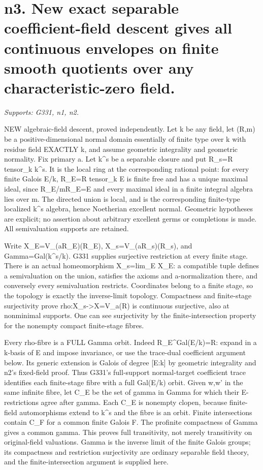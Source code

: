 \section{n3. New exact separable coefficient-field descent gives all continuous envelopes on finite smooth quotients over any characteristic-zero field.}
\textit{Supports: G331, n1, n2.}

NEW algebraic-field descent, proved independently. Let k be any field, let (R,m) be a positive-dimensional normal domain essentially of finite type over k with residue field EXACTLY k, and assume geometric integrality and geometric normality. Fix primary a. Let k\textasciicircum{}s be a separable closure and put R\_s=R tensor\_k k\textasciicircum{}s. It is the local ring at the corresponding rational point: for every finite Galois E/k, R\_E=R tensor\_k E is finite free and has a unique maximal ideal, since R\_E/mR\_E=E and every maximal ideal in a finite integral algebra lies over m. The directed union is local, and is the corresponding finite-type localized k\textasciicircum{}s algebra, hence Noetherian excellent normal. Geometric hypotheses are explicit; no assertion about arbitrary excellent germs or completions is made. All semivaluation supports are retained.

Write X\_E=V\_(aR\_E)(R\_E), X\_s=V\_(aR\_s)(R\_s), and Gamma=Gal(k\textasciicircum{}s/k). G331 supplies surjective restriction at every finite stage. There is an actual homeomorphism X\_s=lim\_E X\_E: a compatible tuple defines a semivaluation on the union, satisfies the axioms and a-normalization there, and conversely every semivaluation restricts. Coordinates belong to a finite stage, so the topology is exactly the inverse-limit topology. Compactness and finite-stage surjectivity prove rho:X\_s-\textgreater{}X=V\_a(R) is continuous surjective, also at nonminimal supports. One can see surjectivity by the finite-intersection property for the nonempty compact finite-stage fibres.

Every rho-fibre is a FULL Gamma orbit. Indeed R\_E\textasciicircum{}Gal(E/k)=R: expand in a k-basis of E and impose invariance, or use the trace-dual coefficient argument below. Its generic extension is Galois of degree [E:k] by geometric integrality and n2's fixed-field proof. Thus G331's full-support normal-target coefficient trace identifies each finite-stage fibre with a full Gal(E/k) orbit. Given w,w' in the same infinite fibre, let C\_E be the set of gamma in Gamma for which their E-restrictions agree after gamma. Each C\_E is nonempty clopen, because finite-field automorphisms extend to k\textasciicircum{}s and the fibre is an orbit. Finite intersections contain C\_F for a common finite Galois F. The profinite compactness of Gamma gives a common gamma. This proves full transitivity, not merely transitivity on original-field valuations. Gamma is the inverse limit of the finite Galois groups; its compactness and restriction surjectivity are ordinary separable field theory, and the finite-intersection argument is supplied here.

